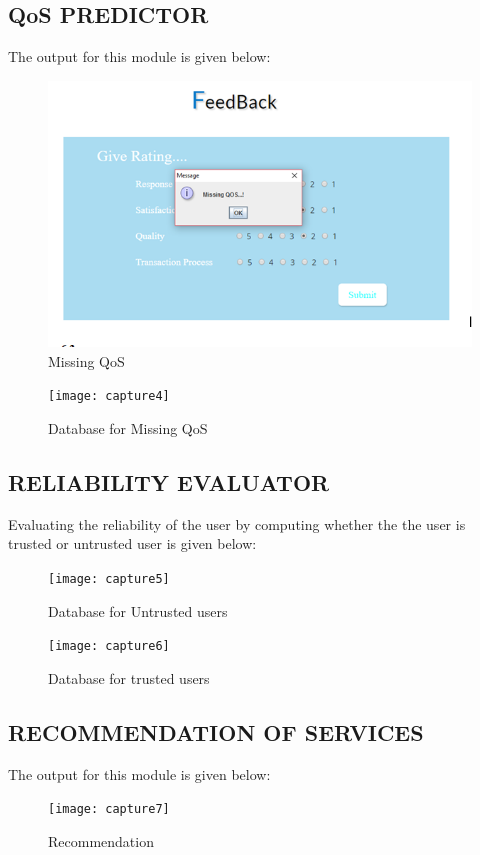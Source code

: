 \newpage
\subsection{QoS PREDICTOR}
The output for this module is given below:

\begin{figure}[htp]
\centering
\includegraphics[width=15cm]{capture3}
\caption{Missing QoS}
\label{fig:lion}
\end{figure}

\begin{figure}[htp]
\centering
\texttt{[image: capture4]}
\caption{Database for Missing QoS}
\label{fig:lion}
\end{figure}


\subsection{RELIABILITY EVALUATOR}
Evaluating the reliability of the user by  computing whether the the user is trusted or untrusted user is given below:

\begin{figure}[htp]
\centering
\texttt{[image: capture5]}
\caption{Database for Untrusted users}
\label{fig:lion}
\end{figure}


\begin{figure}[htp]
\centering
\texttt{[image: capture6]}
\caption{Database for trusted users}
\label{fig:lion}
\end{figure}


\subsection{RECOMMENDATION OF SERVICES}
The output for this module is given below:

\begin{figure}[htp]
\centering
\texttt{[image: capture7]}
\caption{Recommendation}
\label{fig:lion}
\end{figure}

 
